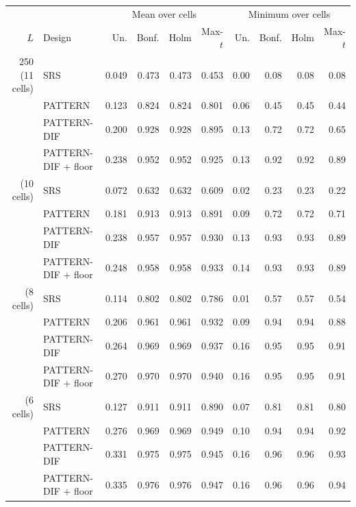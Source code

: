 \begin{tabular}{rl rrrr rrrr}\toprule
 & & \multicolumn{4}{c}{Mean over cells} & \multicolumn{4}{c}{Minimum over cells} \\
$L$ & Design & Un. & Bonf. & Holm & Max-$t$ & Un. & Bonf. & Holm & Max-$t$ \\\midrule
250 (11 cells) & SRS & 0.049 & 0.473 & 0.473 & 0.453 & 0.00 & 0.08 & 0.08 & 0.08 \\
 & PATTERN & 0.123 & 0.824 & 0.824 & 0.801 & 0.06 & 0.45 & 0.45 & 0.44 \\
 & PATTERN-DIF & 0.200 & 0.928 & 0.928 & 0.895 & 0.13 & 0.72 & 0.72 & 0.65 \\
 & PATTERN-DIF + floor & 0.238 & 0.952 & 0.952 & 0.925 & 0.13 & 0.92 & 0.92 & 0.89 \\
\addlinespace
500 (10 cells) & SRS & 0.072 & 0.632 & 0.632 & 0.609 & 0.02 & 0.23 & 0.23 & 0.22 \\
 & PATTERN & 0.181 & 0.913 & 0.913 & 0.891 & 0.09 & 0.72 & 0.72 & 0.71 \\
 & PATTERN-DIF & 0.238 & 0.957 & 0.957 & 0.930 & 0.13 & 0.93 & 0.93 & 0.89 \\
 & PATTERN-DIF + floor & 0.248 & 0.958 & 0.958 & 0.933 & 0.14 & 0.93 & 0.93 & 0.89 \\
\addlinespace
1000 (8 cells) & SRS & 0.114 & 0.802 & 0.802 & 0.786 & 0.01 & 0.57 & 0.57 & 0.54 \\
 & PATTERN & 0.206 & 0.961 & 0.961 & 0.932 & 0.09 & 0.94 & 0.94 & 0.88 \\
 & PATTERN-DIF & 0.264 & 0.969 & 0.969 & 0.937 & 0.16 & 0.95 & 0.95 & 0.91 \\
 & PATTERN-DIF + floor & 0.270 & 0.970 & 0.970 & 0.940 & 0.16 & 0.95 & 0.95 & 0.91 \\
\addlinespace
2000 (6 cells) & SRS & 0.127 & 0.911 & 0.911 & 0.890 & 0.07 & 0.81 & 0.81 & 0.80 \\
 & PATTERN & 0.276 & 0.969 & 0.969 & 0.949 & 0.10 & 0.94 & 0.94 & 0.92 \\
 & PATTERN-DIF & 0.331 & 0.975 & 0.975 & 0.945 & 0.16 & 0.96 & 0.96 & 0.93 \\
 & PATTERN-DIF + floor & 0.335 & 0.976 & 0.976 & 0.947 & 0.16 & 0.96 & 0.96 & 0.94 \\
\bottomrule\end{tabular}
